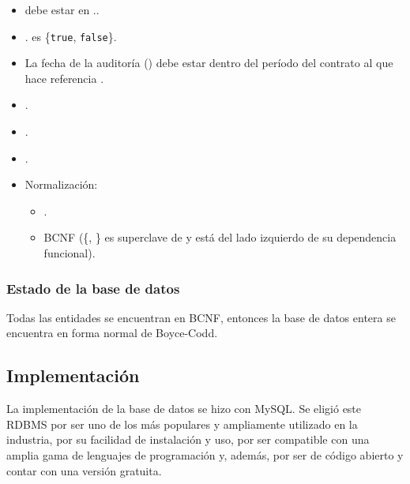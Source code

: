           \begin{itemize}
              \item {} debe estar en ..
              \item {}. es \{\texttt{true},
                    \texttt{false}\}.
              \item La fecha de la auditoría () debe estar dentro del
                  período del contrato al que hace referencia .
              \item {}.
              \item {}.
              \item {}.
              \item Normalización:
                    \begin{itemize}
                        \item {}.
                        \item BCNF (\{, \} es superclave de
                               y está del lado izquierdo de su dependencia funcional).
                    \end{itemize}
          \end{itemize}

\subsubsection{Estado de la base de datos}

Todas las entidades se encuentran en BCNF, entonces la base de datos entera se
encuentra en forma normal de Boyce-Codd.

\subsection{Implementación}
\label{sec:implementacion}

La implementación de la base de datos se hizo con MySQL. Se eligió este RDBMS 
por ser uno de los más populares y ampliamente utilizado en la industria, por su
facilidad de instalación y uso, por ser compatible con una amplia gama de 
lenguajes de programación y, además, por ser de código abierto y contar con una
versión gratuita.

